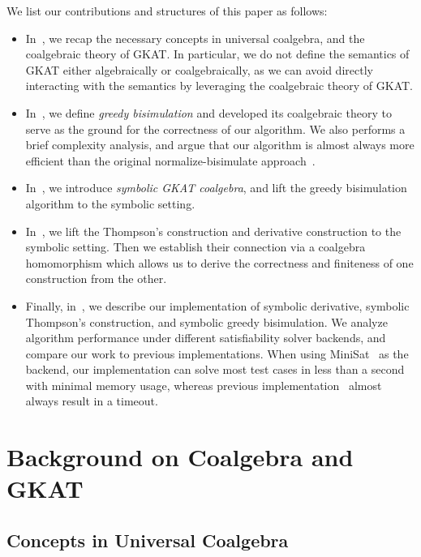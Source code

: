 \documentclass[conference]{IEEEtran}
\begin{document}
We list our contributions and structures of this paper as follows:
\begin{itemize}
    \item In~, we recap the necessary concepts in universal coalgebra, and the coalgebraic theory of GKAT. In particular, we do not define the semantics of GKAT either algebraically or coalgebraically, as we can avoid directly interacting with the semantics by leveraging the coalgebraic theory of GKAT.
    \item In~, we define \emph{greedy bisimulation} and developed its coalgebraic theory to serve as the ground for the correctness of our algorithm.
    We also performs a brief complexity analysis, and argue that our algorithm is almost always more efficient than the original normalize-bisimulate approach~\cite{smolka_GuardedKleeneAlgebra_2020}.
    \item In~, we introduce \emph{symbolic GKAT coalgebra}, and lift the greedy bisimulation algorithm to the symbolic setting.
    \item In~, we lift the Thompson's construction and derivative construction to the symbolic setting.
    Then we establish their connection via a coalgebra homomorphism which allows us to derive the correctness and finiteness of one construction from the other.
    \item Finally, in~, we describe our implementation of symbolic derivative, symbolic Thompson's construction, and symbolic greedy bisimulation.
    We analyze algorithm performance under different satisfiability solver backends, and compare our work to previous implementations.
    When using MiniSat~\cite{een_MINISAT_2004} as the backend, our implementation can solve most test cases in less than a second with minimal memory usage, whereas previous implementation~\cite{pous_SymbolicAlgorithmsLanguage_2015} almost always result in a timeout.
\end{itemize}

\section{Background on Coalgebra and GKAT}\label{sec:background}

\subsection{Concepts in Universal Coalgebra}
\end{document}
